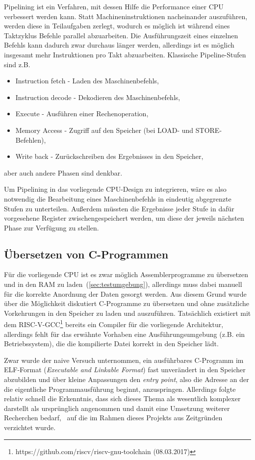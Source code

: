 Pipelining ist ein Verfahren, mit dessen Hilfe die Performance einer CPU verbessert werden kann.
Statt Machineninstruktionen nacheinander auszuführen, werden diese in Teilaufgaben zerlegt, wodurch es möglich ist während eines Taktzyklus Befehle parallel abzuarbeiten.
Die Ausführungszeit eines einzelnen Befehls kann dadurch zwar durchaus länger werden, allerdings ist es möglich insgesamt mehr Instruktionen pro Takt abzuarbeiten.
Klassische Pipeline-Stufen sind z.B.
\begin{itemize}
    \item Instruction fetch - Laden des Maschinenbefehls,
    \item Instruction decode - Dekodieren des Maschinenbefehls,
    \item Execute - Ausführen einer Rechenoperation,
    \item Memory Access - Zugriff auf den Speicher (bei LOAD- und STORE-Befehlen),
    \item Write back - Zurückschreiben des Ergebnisses in den Speicher,
\end{itemize}
aber auch andere Phasen sind denkbar.

Um Pipelining in das vorliegende CPU-Design zu integrieren, wäre es also notwendig die Bearbeitung eines Maschinenbefehls in eindeutig abgegrenzte Stufen zu unterteilen. 
Außerdem müssten die Ergebnisse jeder Stufe in dafür vorgesehene Register zwischengespeichert werden, um diese der jeweils nächsten Phase zur Verfügung zu stellen.

\subsection{Übersetzen von C-Programmen}
Für die vorliegende CPU ist es zwar möglich Assemblerprogramme zu übersetzen und in den RAM zu laden~(\ref{sec:testumgebung}), allerdings muss dabei manuell für die korrekte Anordnung der Daten gesorgt werden.
Aus diesem Grund wurde über die Möglichkeit diskutiert C-Programme zu übersetzen und ohne zusätzliche Vorkehrungen in den Speicher zu laden und auszuführen.
Tatsächlich existiert mit dem RISC-V-GCC\footnote{https://github.com/riscv/riscv-gnu-toolchain (08.03.2017)} bereits ein Compiler für die vorliegende Architektur, allerdings fehlt für das erwähnte Vorhaben eine Ausführungsumgebung (z.B. ein Betriebssystem), die die kompilierte Datei korrekt in den Speicher lädt.

Zwar wurde der naive Versuch unternommen, ein ausführbares C-Programm im ELF-Format (\textit{Executable and Linkable Format}) fast unverändert in den Speicher abzubilden und über kleine Anpassungen den \textit{entry point}, also die Adresse an der die eigentliche Programmausführung beginnt, anzuspringen.
Allerdings folgte relativ schnell die Erkenntnis, dass sich dieses Thema als wesentlich komplexer darstellt als ursprünglich angenommen und damit eine Umsetzung weiterer Recherchen bedarf,~\cite[S. 9 ff.]{elf} auf die im Rahmen dieses Projekts aus Zeitgründen verzichtet wurde.




